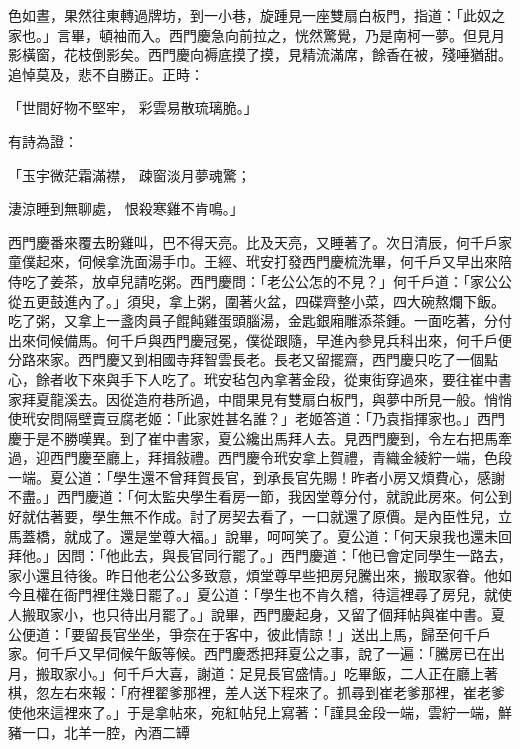 \begin{showcontents}{}
色如晝，果然往東轉過牌坊，到一小巷，旋踵見一座雙扇白板門，指道：「此奴之家也。」言畢，頓袖而入。西門慶急向前拉之，恍然驚覺，乃是南柯一夢。但見月影橫窗，花枝倒影矣。西門慶向褥底摸了摸，見精流滿席，餘香在被，殘唾猶甜。追悼莫及，悲不自勝正。正時：

「世間好物不堅牢，  彩雲易散琉璃脆。」

有詩為證：

「玉宇微茫霜滿襟，  疎窗淡月夢魂驚；

淒涼睡到無聊處，  恨殺寒雞不肯鳴。」

西門慶番來覆去盼雞叫，巴不得天亮。比及天亮，又睡著了。次日清辰，何千戶家童僕起來，伺候拿洗面湯手巾。王經、玳安打發西門慶梳洗畢，何千戶又早出來陪侍吃了姜茶，放卓兒請吃粥。西門慶問：「老公公怎的不見？」何千戶道：「家公公從五更鼓進內了。」須臾，拿上粥，圍著火盆，四碟齊整小菜，四大碗熬爛下飯。吃了粥，又拿上一盞肉員子餛飩雞蛋頭腦湯，金匙銀廂雕添茶鍾。一面吃著，分付出來伺候備馬。何千戶與西門慶冠冕，僕從跟隨，早進內參見兵科出來，何千戶便分路來家。西門慶又到相國寺拜智雲長老。長老又留擺齋，西門慶只吃了一個點心，餘者收下來與手下人吃了。玳安毡包內拿著金段，從東街穿過來，要往崔中書家拜夏龍溪去。因從造府巷所過，中間果見有雙扇白板門，與夢中所見一般。悄悄使玳安問隔壁賣豆腐老姬：「此家姓甚名誰？」老姬答道：「乃袁指揮家也。」西門慶于是不勝嘆異。到了崔中書家，夏公纔出馬拜人去。見西門慶到，令左右把馬牽過，迎西門慶至廳上，拜揖敍禮。西門慶令玳安拿上賀禮，青織金綾紵一端，色段一端。夏公道：「學生還不曾拜賀長官，到承長官先賜！昨者小房又煩費心，感謝不盡。」西門慶道：「何太監央學生看房一節，我因堂尊分付，就說此房來。何公到好就估著要，學生無不作成。討了房契去看了，一口就還了原價。是內臣性兒，立馬蓋橋，就成了。還是堂尊大福。」說畢，呵呵笑了。夏公道：「何天泉我也還未回拜他。」因問：「他此去，與長官同行罷了。」西門慶道：「他已會定同學生一路去，家小還且待後。昨日他老公公多致意，煩堂尊早些把房兒騰出來，搬取家眷。他如今且權在衙門裡住幾日罷了。」夏公道：「學生也不肯久稽，待這裡尋了房兒，就使人搬取家小，也只待出月罷了。」說畢，西門慶起身，又留了個拜帖與崔中書。夏公便道：「要留長官坐坐，爭奈在于客中，彼此情諒！」送出上馬，歸至何千戶家。何千戶又早伺候午飯等候。西門慶悉把拜夏公之事，說了一遍：「騰房已在出月，搬取家小。」何千戶大喜，謝道：足見長官盛情。」吃畢飯，二人正在廳上著棋，忽左右來報：「府裡翟爹那裡，差人送下程來了。抓尋到崔老爹那裡，崔老爹使他來這裡來了。」于是拿帖來，宛紅帖兒上寫著：「謹具金段一端，雲紵一端，鮮豬一口，北羊一腔，內酒二罈 
\end{showcontents}
